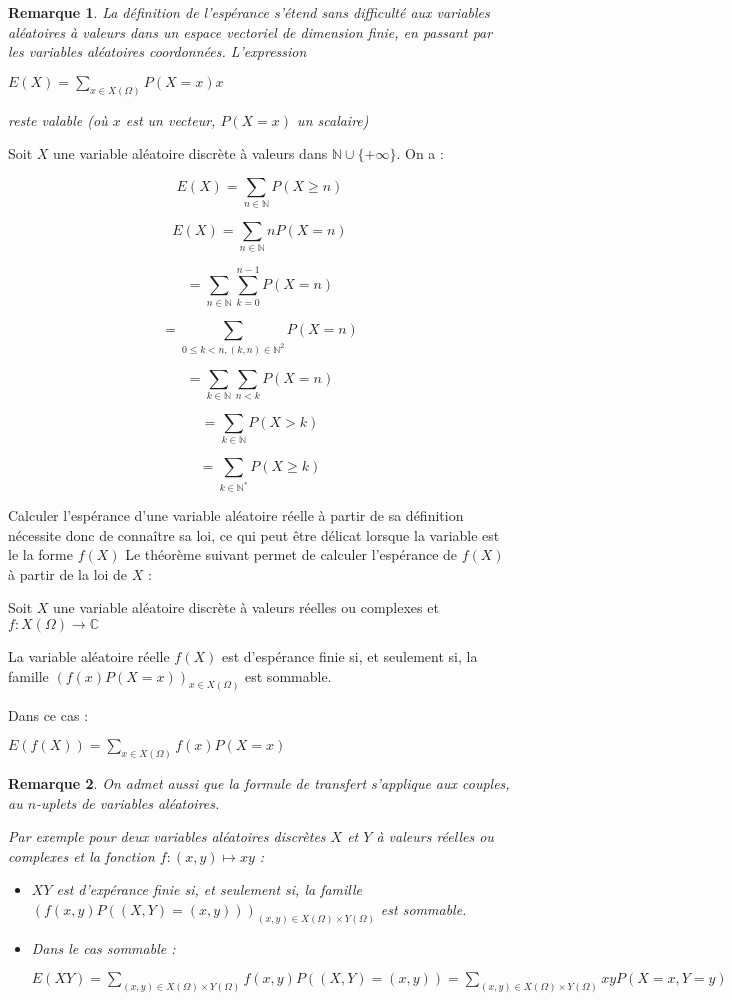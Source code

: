 \documentclass[a4paper,12pt]{book}
\newcommand{\Thr}[2]{\begin{tcolorbox}[sharp corners, colback=white,colframe=red!90!black!75, title=Théorème : #1]#2\end{tcolorbox}}
\newcommand{\Prop}[2]{\begin{tcolorbox}[sharp corners, colback=white,colframe=red!90!black!75, title=Proposition : #1]#2\end{tcolorbox}}
\newcommand{\Pre}[1]{\begin{tcolorbox}[sharp corners, colback=white,colframe=green!60!green!30!black!75, title=Preuve]#1\end{tcolorbox}}
\newtheorem{Rem}{Remarque}[section]
\def\C{\mathbb{C}}
\def\N{\mathbb{N}}
\begin{document}
\begin{Rem}
La définition de l'espérance s'étend sans difficulté aux variables aléatoires à valeurs dans un espace vectoriel de dimension finie, en passant par les variables aléatoires coordonnées. L'expression
\par \begin{center} $E(X)=\sum\limits_{x\in X(\Omega)}P(X=x)x$\end{center}
\par reste valable (où $x$ est un vecteur, $P(X=x)$ un scalaire)
\end{Rem}
\Prop{}{Soit $X$ une variable aléatoire discrète à valeurs dans $\N\cup\{+\infty\}$. On a :
\par $$E(X)=\sum\limits_{n\in\N}P(X\geq n)$$}
\Pre{$$E(X)= \sum\limits_{n\in\N}nP(X=n)$$
\par $$ =\sum\limits_{n\in\N}\sum\limits_{k=0}^{n-1}P(X=n)$$
\par $$ =\sum\limits_{0\leq k<n, (k,n)\in\N^2}P(X=n)$$
\par $$=\sum\limits_{k\in\N}\sum\limits_{n<k}P(X=n)$$
\par $$=\sum\limits_{k\in\N}P(X>k)$$
\par $$=\sum\limits_{k\in\N^*}P(X\geq k)$$}
Calculer l'espérance d'une variable aléatoire réelle à partir de sa définition nécessite donc de connaître sa loi, ce qui peut être délicat lorsque la variable est le la forme $f(X)$
Le théorème suivant permet de calculer l'espérance de $f(X)$ à partir de la loi de $X$ :
\Thr{Transfert}{Soit $X$ une variable aléatoire discrète à valeurs réelles ou complexes et $f:X(\Omega)\to\C$
\par La variable aléatoire réelle $f(X)$ est d'espérance finie si, et seulement si, la famille $(f(x)P(X=x))_{x\in X(\Omega)}$ est sommable.
\par Dans ce cas :
\par\begin{center}$E(f(X))=\sum\limits_{x\in X(\Omega)}f(x)P(X=x)$\end{center}}
\begin{Rem}
On admet aussi que la formule de transfert s'applique aux couples, au $n$-uplets de variables aléatoires.
\par Par exemple pour deux variables aléatoires discrètes $X$ et $Y$ à valeurs réelles ou complexes et la fonction $f:(x,y)\mapsto xy$ :\begin{itemize}
\item $XY$ est d'expérance finie si, et seulement si, la famille $(f(x,y)P((X,Y)=(x,y)))_{(x,y)\in X(\Omega)\times Y(\Omega)}$ est sommable.
\item Dans le cas sommable : \par\begin{center}$E(XY)=\sum\limits_{(x,y)\in X(\Omega)\times Y(\Omega)}f(x,y)P((X,Y)=(x,y))=\sum\limits_{(x,y)\in X(\Omega)\times Y(\Omega)}xyP(X=x, Y=y)$\end{center}
\end{itemize}
\end{Rem}
\end{document}
